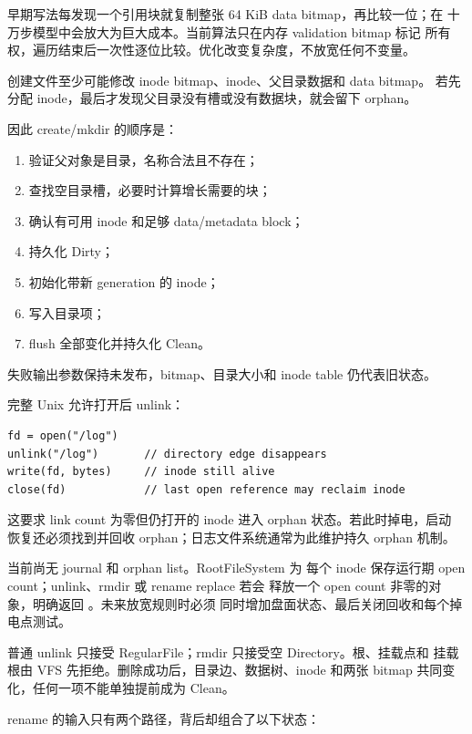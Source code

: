 早期写法每发现一个引用块就复制整张 64 KiB data bitmap，再比较一位；在
十万步模型中会放大为巨大成本。当前算法只在内存 validation bitmap 标记
所有权，遍历结束后一次性逐位比较。优化改变复杂度，不放宽任何不变量。

创建文件至少可能修改 inode bitmap、inode、父目录数据和 data bitmap。
若先分配 inode，最后才发现父目录没有槽或没有数据块，就会留下 orphan。

因此 create/mkdir 的顺序是：

\begin{enumerate}
  \item 验证父对象是目录，名称合法且不存在；
  \item 查找空目录槽，必要时计算增长需要的块；
  \item 确认有可用 inode 和足够 data/metadata block；
  \item 持久化 Dirty；
  \item 初始化带新 generation 的 inode；
  \item 写入目录项；
  \item flush 全部变化并持久化 Clean。
\end{enumerate}

失败输出参数保持未发布，bitmap、目录大小和 inode table 仍代表旧状态。

完整 Unix 允许打开后 unlink：

\begin{lstlisting}[caption={成熟 Unix 中名字和打开生命周期分离}]
fd = open("/log")
unlink("/log")       // directory edge disappears
write(fd, bytes)     // inode still alive
close(fd)            // last open reference may reclaim inode
\end{lstlisting}

这要求 link count 为零但仍打开的 inode 进入 orphan 状态。若此时掉电，启动
恢复还必须找到并回收 orphan；日志文件系统通常为此维护持久 orphan 机制。

当前尚无 journal 和 orphan list。RootFileSystem 为
每个 inode 保存运行期 open count；unlink、rmdir 或 rename replace 若会
释放一个 open count 非零的对象，明确返回 。未来放宽规则时必须
同时增加盘面状态、最后关闭回收和每个掉电点测试。

普通 unlink 只接受 RegularFile；rmdir 只接受空 Directory。根、挂载点和
挂载根由 VFS 先拒绝。删除成功后，目录边、数据树、inode 和两张 bitmap
共同变化，任何一项不能单独提前成为 Clean。

rename 的输入只有两个路径，背后却组合了以下状态：

